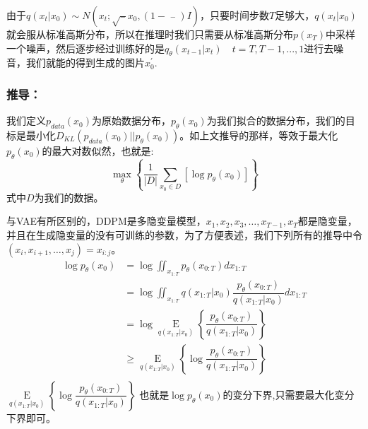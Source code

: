 \documentclass[withoutpreface,bwprint]{cumcmthesis} %
\begin{document}
	由于$q(x_{t}|x_{0}) \sim N(x_{t};\sqrt{\mathop{\alpha_t}\limits^{-}} x_0,\left( 1-\mathop{\alpha_t}\limits^{-} \right) I)$，只要时间步数$T$足够大，$q(x_{t}|x_{0})$就会服从标准高斯分布，所以在推理时我们只需要从标准高斯分布$p(x_T)$中采样一个噪声，然后逐步经过训练好的是$q_{\theta}(x_{t-1}|x_{t}) \quad t=T,T-1,...,1$进行去噪音，我们就能的得到生成的图片$x_0^{'}$.
	\subsubsection{推导：}
	我们定义$p_{data}(x_0)$为原始数据分布，$p_{\theta}(x_0)$为我们拟合的数据分布，我们的目标是最小化$D_{KL}(p_{data}(x_0)||p_{\theta}(x_0))$。如上文推导的那样，等效于最大化$p_{\theta}(x_0)$的最大对数似然，也就是:
	$$
	\mathop{max}\limits_{\theta} \left\{ \dfrac{1}{|D|}\sum_{x_0 \in D} \left[\log {p_{\theta}(x_0)} \right] \right\}
	$$
	式中$D$为我们的数据。
	
	与VAE有所区别的，DDPM是多隐变量模型，$x_1,x_2,x_3,\ldots,x_{T-1},x_T$都是隐变量，并且在生成隐变量的没有可训练的参数，为了方便表述，我们下列所有的推导中令$(x_i,x_{i+1},\ldots,x_{j})=x_{i:j}$。
	\begin{align*}
		\log p_{\theta}(x_0) & =\log \iint_{x_{1:T}} p_{\theta}(x_{0:T}) dx_{1:T} \\
					& =\log \iint_{x_{1:T}} q(x_{1:T}|x_0) \dfrac{p_{\theta}(x_{0:T})}{q(x_{1:T}|x_0)}  dx_{1:T} \\ 
					& =\log \mathop{E}\limits_{ q(x_{1:T}|x_0) } \left\{ \dfrac{p_{\theta}(x_{0:T})}{q(x_{1:T}|x_0)} \right\} \\
					& \geq \mathop{E}\limits_{ q(x_{1:T}|x_0) }  \left\{ \log \dfrac{p_{\theta}(x_{0:T})}{q(x_{1:T}|x_0)} \right\}  \\				
	\end{align*}
	$\mathop{E}\limits_{ q(x_{1:T}|x_0) }  \left\{ \log \dfrac{p_{\theta}(x_{0:T})}{q(x_{1:T}|x_0)} \right\} $ 也就是$\log p_{\theta}(x_0)$的变分下界,只需要最大化变分下界即可。\\ 
	
\end{document}
